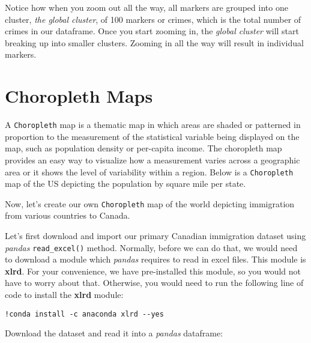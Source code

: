 \documentclass[11pt]{article}
\begin{document}
    Notice how when you zoom out all the way, all markers are grouped into
one cluster, \emph{the global cluster}, of 100 markers or crimes, which
is the total number of crimes in our dataframe. Once you start zooming
in, the \emph{global cluster} will start breaking up into smaller
clusters. Zooming in all the way will result in individual markers.

    \hypertarget{choropleth-maps}{%
\section{\texorpdfstring{Choropleth Maps
}{Choropleth Maps }}\label{choropleth-maps}}

A \texttt{Choropleth} map is a thematic map in which areas are shaded or
patterned in proportion to the measurement of the statistical variable
being displayed on the map, such as population density or per-capita
income. The choropleth map provides an easy way to visualize how a
measurement varies across a geographic area or it shows the level of
variability within a region. Below is a \texttt{Choropleth} map of the
US depicting the population by square mile per state.

    Now, let's create our own \texttt{Choropleth} map of the world depicting
immigration from various countries to Canada.

Let's first download and import our primary Canadian immigration dataset
using \emph{pandas} \texttt{read\_excel()} method. Normally, before we
can do that, we would need to download a module which \emph{pandas}
requires to read in excel files. This module is \textbf{xlrd}. For your
convenience, we have pre-installed this module, so you would not have to
worry about that. Otherwise, you would need to run the following line of
code to install the \textbf{xlrd} module:

\begin{verbatim}
!conda install -c anaconda xlrd --yes
\end{verbatim}

    Download the dataset and read it into a \emph{pandas} dataframe:
\end{document}
